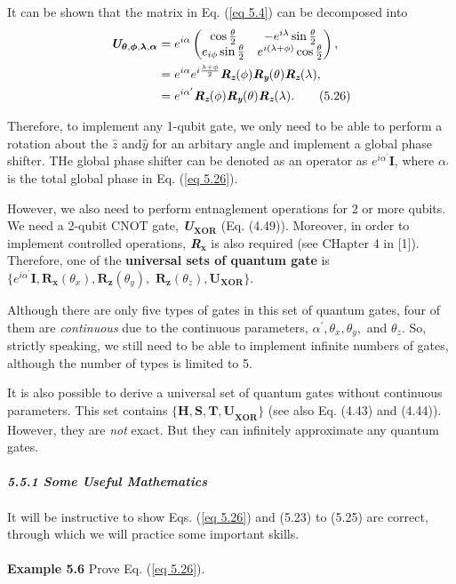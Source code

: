 \documentclass{article}
\newcommand{\bfit}[1]{\textit{\textbf{#1}}}
\begin{document}
It can be shown that the matrix in Eq. (\ref{eq 5.4}) can be decomposed into
\begin{align*} \label{eq 5.26}
    \bfit{U}_{\boldsymbol{\theta},\boldsymbol{\phi},\boldsymbol{\lambda},\boldsymbol{\alpha}}&=e^{i\alpha}\begin{pmatrix}
        \cos{\frac{\theta}{2}}&-e^{i\lambda}\sin{\frac{\theta}{2}}\\
        e_{i\phi}\sin{\frac{\theta}{2}}& e^{i(\lambda+\phi)}\cos{\frac{\theta}{2}}
    \end{pmatrix},\\
    &=e^{i\alpha}e^{i\frac{\lambda+\phi}{2}}\bfit{R}_{\bfit{z}}(\phi)\bfit{R}_{\bfit{y}}(\theta)\bfit{R}_{\bfit{z}}(\lambda),\\
    &=e^{i\alpha^\prime}\bfit{R}_{\bfit{z}}(\phi)\bfit{R}_{\bfit{y}}(\theta)\bfit{R}_{\bfit{z}}(\lambda). \tag{5.26}
\end{align*}

Therefore, to implement any 1-qubit gate, we only need to be able to
perform a rotation about the $\hat{z}$ and$\hat{y}$ for an arbitary angle
and implement a global phase shifter. THe global phase shifter can be denoted as an operator
as $e^{i\alpha^\prime} \boldsymbol{I}$, where $\alpha_\prime$ is the total global phase in Eq. (\ref{eq 5.26}).

However, we also need to perform entnaglement operations for 2 or more qubits.
We need a 2-qubit CNOT gate, \bfit{U}$_{\boldsymbol{X O R}}$ (Eq. (4.49)). Moreover,
in order to implement controlled operations, \bfit{R}$_{\boldsymbol{x}}$ is also required (see CHapter 4 in [1]).
Therefore, one of the \textbf{universal sets of quantum gate} is $\{ e^{i\alpha^\prime}\boldsymbol{I}, \boldsymbol{R_x}(\theta_x),
\boldsymbol{R_z}(\theta_y),$ $\boldsymbol{R_z}(\theta_z),\boldsymbol{U}_{\boldsymbol{X O R}} \}$.

Although there are only five types of gates in this set of quantum gates, four of them are \textit{continuous}
due to the continuous parameters, $\alpha^\prime, \theta_x, \theta_y,$ and $\theta_z$.
So, strictly speaking, we still need to be able to implement infinite numbers of gates, although
the number of types is limited to 5.

It is also possible to derive a universal set of quantum gates without continuous
parameters. This set contains $\{ \boldsymbol{H, S, T, U}_{\boldsymbol{X O R}} \}$ (see 
also Eq. (4.43) and (4.44)). However, they are \textit{not} exact. But they can infinitely
approximate any quantum gates.
\\\\
\bfit{\large 5.5.1 Some Useful Mathematics}\\\\
It will be instructive to show Eqs. (\ref{eq 5.26}) and (5.23) to (5.25) are correct,
through which we will practice some important skills.\\\\
\textbf{Example 5.6} Prove Eq. (\ref{eq 5.26}).
\end{document}

